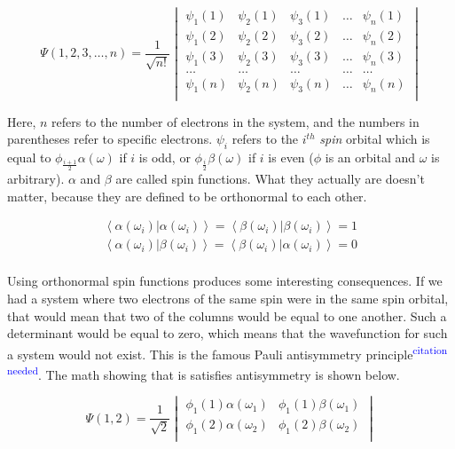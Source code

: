 \documentclass[12pt]{report}
\newcommand{\citethis}{\textsuperscript{\textcolor{blue}{citation needed}}} %
\begin{document}
\begin{equation}
\label{eq:slate_det}
\Psi(1, 2, 3, \ldots, n) =
\frac{1}{\sqrt{n!}}
\begin{vmatrix}
\psi_{1}(1)		&	\psi_{2}(1)		&	\psi_{3}(1)		&	\ldots	&	\psi_{n}(1)		\\
\psi_{1}(2)		&	\psi_{2}(2)		&	\psi_{3}(2)		&	\ldots	&	\psi_{n}(2)		\\
\psi_{1}(3)		&	\psi_{2}(3)		&	\psi_{3}(3)		&	\ldots	&	\psi_{n}(3)		\\
\ldots		&	\ldots		&	\ldots		&	\ldots	&	\ldots		\\
\psi_{1}(n)		&	\psi_{2}(n)		&	\psi_{3}(n)		&	\ldots	&	\psi_{n}(n)		\\

\end{vmatrix}
\end{equation} 

Here, $n$ refers to the number of electrons in the system, and the numbers in parentheses refer to specific electrons. $\psi_{i}$ refers to the $i^{th}$ \textit{spin} orbital which is equal to $\phi_{\frac{i+1}{2}}\alpha(\omega)$ if $i$ is odd, or $\phi_{\frac{i}{2}}\beta(\omega)$ if $i$ is even ($\phi$ is an orbital and $\omega$ is arbitrary). $\alpha$ and $\beta$ are called spin functions. What they actually are doesn't matter, because they are defined to be orthonormal to each other. 

\begin{equation}
\label{eq:a_b_def}
\begin{split}
\left<\alpha(\omega_{i})|\alpha(\omega_{i})\right> = \left<\beta(\omega_{i})|\beta(\omega_{i})\right> = 1	\\
\left<\alpha(\omega_{i})|\beta(\omega_{i})\right> = \left<\beta(\omega_{i})|\alpha(\omega_{i})\right> = 0	\\
\end{split}
\end{equation}

Using orthonormal spin functions produces some interesting consequences. If we had a system where two electrons of the same spin were in the same spin orbital, that would mean that two of the columns would be equal to one another. Such a determinant would be equal to zero, which means that the wavefunction for such a system would not exist. This is the famous Pauli antisymmetry principle\citethis. The math showing that is satisfies antisymmetry is shown below.

\begin{equation}
\label{eq:pauli_2t_1}
\Psi(1,2) =
\frac{1}{\sqrt{2}}
\begin{vmatrix}
\phi_{1}(1)\alpha(\omega_{1})		&	\phi_{1}(1)\beta(\omega_{1})		\\
\phi_{1}(2)\alpha(\omega_{2})		&	\phi_{1}(2)\beta(\omega_{2})		\\
\end{vmatrix}
\end{equation}
\end{document}
